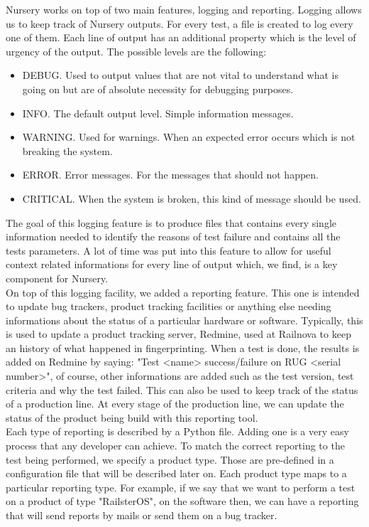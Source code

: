 \documentclass[12pt]{article}
\theoremstyle{definition}
\theoremstyle{definition}
\theoremstyle{remark}
\begin{document}
Nursery works on top of two main features, logging and reporting. Logging allows us to keep track of Nursery outputs. For every test, a file is created to log every one of them. Each line of output has an additional property which is the level of urgency of the output. The possible levels are the following:

\begin{itemize}
\item DEBUG. Used to output values that are not vital to understand what is going on but are of absolute necessity for debugging purposes.
\item INFO. The default output level. Simple information messages.
\item WARNING. Used for warnings. When an expected error occurs which is not breaking the system.
\item ERROR. Error messages. For the messages that should not happen.
\item CRITICAL. When the system is broken, this kind of message should be used.
\end{itemize}

The goal of this logging feature is to produce files that contains every single information needed to identify the reasons of test failure and contains all the tests parameters. A lot of time was put into this feature to allow for useful context related informations for every line of output which, we find, is a key component for Nursery.\\

On top of this logging facility, we added a reporting feature. This one is intended to update bug trackers, product tracking facilities or anything else needing informations about the status of a particular hardware or software. Typically, this is used to update a product tracking server, Redmine, used at Railnova to keep an history of what happened in fingerprinting. When a test is done, the results is added on Redmine by saying: "Test <name> success/failure on RUG <serial number>", of course, other informations are added such as the test version, test criteria and why the test failed. This can also be used to keep track of the status of a production line. At every stage of the production line, we can update the status of the product being build with this reporting tool.\\

Each type of reporting is described by a Python file. Adding one is a very easy process that any developer can achieve. To match the correct reporting to the test being performed, we specify a product type. Those are pre-defined in a configuration file that will be described later on. Each product type maps to a particular reporting type. For example, if we say that we want to perform a test on a product of type "RailsterOS", on the software then, we can have a reporting that will send reports by mails or send them on a bug tracker.\\
\end{document}
